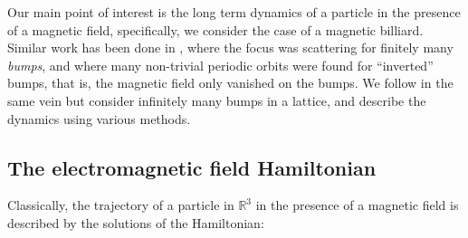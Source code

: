
Our main point of interest is the long term dynamics of a particle in the presence of a magnetic field, specifically, we consider the case of a magnetic billiard. Similar work has been done in \cite{Knauf_2017}, where the focus was scattering for finitely many \textit{bumps}, and \cite{Gasiorek_2021} where many non-trivial periodic orbits were found for ``inverted'' bumps, that is, the magnetic field only vanished on the bumps. We follow in the same vein but consider infinitely many bumps in a lattice, and describe the dynamics using various methods.

\subsection{The electromagnetic field Hamiltonian}

Classically, the trajectory of a particle in $\mathbb R^3$ in the presence of a magnetic field is described by the solutions of the Hamiltonian:

